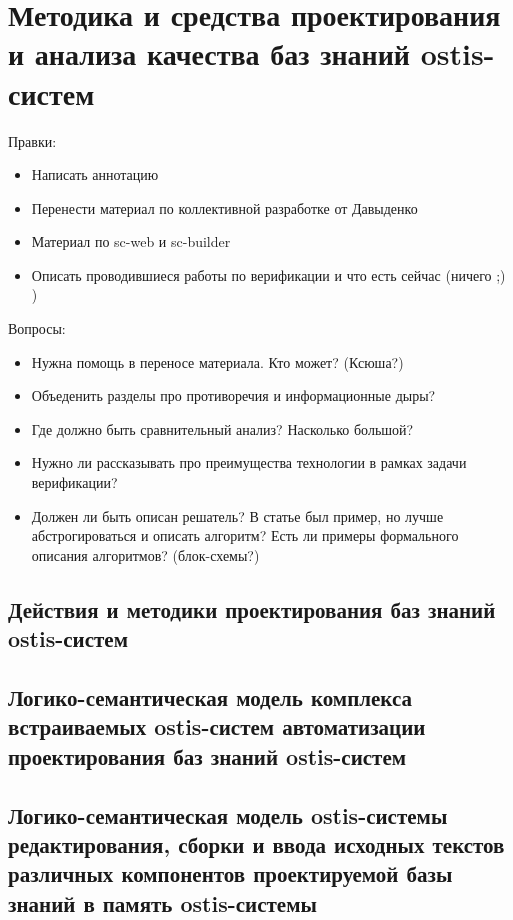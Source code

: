 \chapter{Методика и средства проектирования и анализа качества баз знаний ostis-систем}
\label{chapter_kb_design}


Правки:
\begin{itemize}
	\item Написать аннотацию
	\item Перенести материал по коллективной разработке от Давыденко
	\item Материал по sc-web и sc-builder 
	\item Описать проводившиеся работы по верификации и что есть сейчас (ничего ;) )
\end{itemize}

Вопросы:
\begin{itemize}
	\item Нужна помощь в переносе материала. Кто может? (Ксюша?)
	\item Объеденить разделы про противоречия и информационные дыры?
	\item Где должно быть сравнительный анализ? Насколько большой?
	\item Нужно ли рассказывать про преимущества технологии в рамках задачи верификации?
	\item Должен ли быть описан решатель? В статье был пример, но лучше абстрогироваться и описать алгоритм? Есть ли примеры формального описания алгоритмов? (блок-схемы?)
\end{itemize}

\section{Действия и методики проектирования баз знаний ostis-систем}
\section{Логико-семантическая модель комплекса встраиваемых ostis-систем автоматизации проектирования баз знаний ostis-систем}
\section{Логико-семантическая модель ostis-системы редактирования, сборки и ввода исходных текстов различных компонентов проектируемой базы знаний в память ostis-системы}
